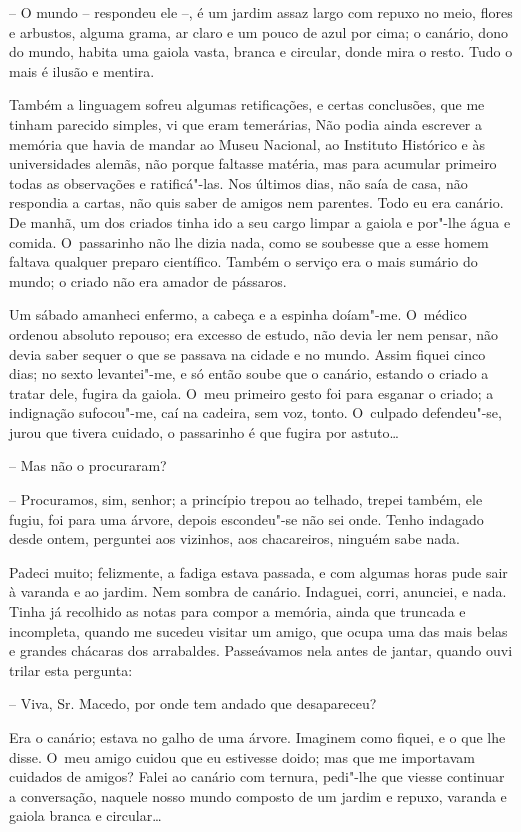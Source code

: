 -- O mundo -- respondeu ele --, é um jardim assaz largo com repuxo no
meio, flores e arbustos, alguma grama, ar claro e um pouco de azul por
cima; o canário, dono do mundo, habita uma gaiola vasta, branca e
circular, donde mira o resto. Tudo o mais é ilusão e mentira.

Também a linguagem sofreu algumas retificações, e certas conclusões, que
me tinham parecido simples, vi que eram temerárias, Não podia ainda
escrever a memória que havia de mandar ao Museu Nacional, ao Instituto
Histórico e às universidades alemãs, não porque faltasse matéria, mas
para acumular primeiro todas as observações e ratificá"-las. Nos últimos
dias, não saía de casa, não respondia a cartas, não quis saber de amigos
nem parentes. Todo eu era canário. De manhã, um dos criados tinha ido a
seu cargo limpar a gaiola e por"-lhe água e comida. O~passarinho não lhe
dizia nada, como se soubesse que a esse homem faltava qualquer preparo
científico. Também o serviço era o mais sumário do mundo; o criado não
era amador de pássaros.

Um sábado amanheci enfermo, a cabeça e a espinha doíam"-me. O~médico
ordenou absoluto repouso; era excesso de estudo, não devia ler nem
pensar, não devia saber sequer o que se passava na cidade e no mundo.
Assim fiquei cinco dias; no sexto levantei"-me, e só então soube que o
canário, estando o criado a tratar dele, fugira da gaiola. O~meu
primeiro gesto foi para esganar o criado; a indignação sufocou"-me, caí
na cadeira, sem voz, tonto. O~culpado defendeu"-se, jurou que tivera
cuidado, o passarinho é que fugira por astuto\ldots{}

-- Mas não o procuraram?

-- Procuramos, sim, senhor; a princípio trepou ao telhado, trepei
também, ele fugiu, foi para uma árvore, depois escondeu"-se não sei onde.
Tenho indagado desde ontem, perguntei aos vizinhos, aos chacareiros,
ninguém sabe nada.

Padeci muito; felizmente, a fadiga estava passada, e com algumas horas
pude sair à varanda e ao jardim. Nem sombra de canário. Indaguei, corri,
anunciei, e nada. Tinha já recolhido as notas para compor a memória,
ainda que truncada e incompleta, quando me sucedeu visitar um amigo, que
ocupa uma das mais belas e grandes chácaras dos arrabaldes. Passeávamos
nela antes de jantar, quando ouvi trilar esta pergunta:

-- Viva, Sr. Macedo, por onde tem andado que desapareceu?

Era o canário; estava no galho de uma árvore. Imaginem como fiquei, e o
que lhe disse. O~meu amigo cuidou que eu estivesse doido; mas que me
importavam cuidados de amigos? Falei ao canário com ternura, pedi"-lhe
que viesse continuar a conversação, naquele nosso mundo composto de um
jardim e repuxo, varanda e gaiola branca e circular\ldots{}

